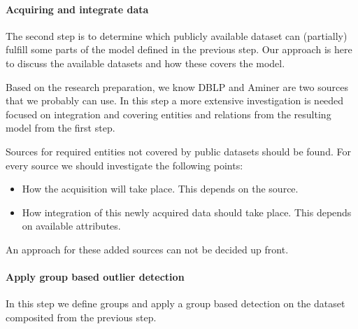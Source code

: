 \documentclass{ou-report}
\newcommand{\dblp}{DBLP}
\begin{document}
\paragraph{Acquiring and integrate data}
The second step is to determine which publicly available dataset can (partially) 
fulfill some parts of the model defined in the previous step. Our approach is here to 
discuss the available datasets and how these covers the model.

Based on the research preparation, we know \dblp{} and Aminer are two sources
that we probably can use. In this step a more extensive investigation is 
needed focused on integration and covering entities and relations from the 
resulting model from the first step.

Sources for required entities not covered by public datasets should be found. 
For every source we should investigate the following points:

\begin{itemize}
    \item How the acquisition will take place. This depends on the source.
    \item How integration of this newly acquired data should take place. This 
        depends on available attributes.
\end{itemize}

An approach for these added sources can not be decided up front.


\paragraph{Apply group based outlier detection}
In this step we define groups and apply a group based detection on the dataset
composited from the previous step.


\end{document}
